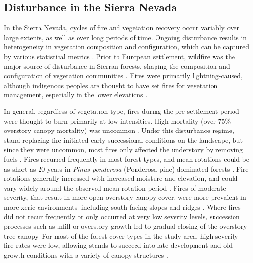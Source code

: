 \subsection{Disturbance in the Sierra Nevada}
In the Sierra Nevada, cycles of fire and vegetation recovery occur variably over large extents, as well as over long periods of time. Ongoing disturbance results in heterogeneity in vegetation composition and configuration, which can be captured by various statistical metrics \citep{Monica2008}. Prior to European settlement, wildfire was the major source of disturbance in Sierran forests, shaping the composition and configuration of vegetation communities \citep{SNEP1996a}. Fires were primarily lightning-caused, although indigenous peoples are thought to have set fires for vegetation management, especially in the lower elevations \citep{Anderson1996}. 

In general, regardless of vegetation type, fires during the pre-settlement period were thought to burn primarily at low intensities. High mortality (over 75\% overstory canopy mortality) was uncommon \citep{Skinner1996, SNEP1996a,Mallek2013,Stephens2015}. Under this disturbance regime, stand-replacing fire initiated early successional conditions on the landscape, but since they were uncommon, most fires only affected the understory by removing fuels \citep{Skinner1996, SNEP1996a,Mallek2013}. Fires recurred frequently in most forest types, and mean rotations could be as short as 20 years in \emph{Pinus ponderosa} (Ponderosa pine)-dominated forests \citep{Mallek2013}.  Fire rotations generally increased with increased moisture and elevation, and could vary widely around the observed mean rotation period \citep{Mallek2013}. Fires of moderate severity, that result in more open overstory canopy cover, were more prevalent in more xeric environments, including south-facing slopes and ridges \citep{Mallek2013,Safford2014,SNEP1996a,SNEP1996}. Where fires did not recur frequently or only occurred at very low severity levels, succession processes such as infill or overstory growth led to gradual closing of the overstory tree canopy. For most of the forest cover types in the study area, high severity fire rates were low, allowing stands to succeed into late development and old growth conditions with a variety of canopy structures \citep{Mallek2013,Safford2014,SNEP1996a,SNEP1996}.


